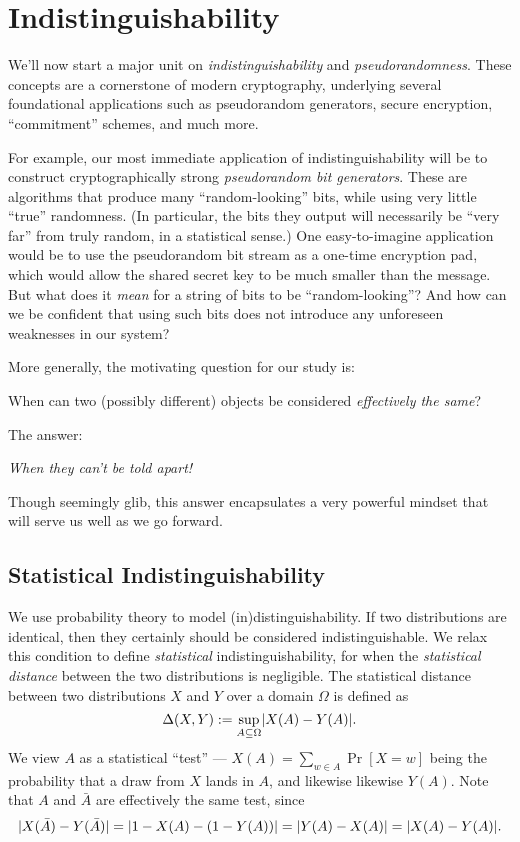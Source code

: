\documentclass[11pt]{article}
\begin{document}
\thispagestyle{fancy}           %


\section{Indistinguishability}
\label{sec:indistinguishability}

We'll now start a major unit on \emph{indistinguishability} and
\emph{pseudorandomness}.  These concepts are a cornerstone of modern
cryptography, underlying several foundational applications such as
pseudorandom generators, secure encryption, ``commitment'' schemes,
and much more.

For example, our most immediate application of indistinguishability
will be to construct cryptographically strong \emph{pseudorandom bit
  generators}.  These are algorithms that produce many
``random-looking'' bits, while using very little ``true'' randomness.
(In particular, the bits they output will necessarily be ``very far''
from truly random, in a statistical sense.)  One easy-to-imagine
application would be to use the pseudorandom bit stream as a one-time
encryption pad, which would allow the shared secret key to be much
smaller than the message.  But what does it \emph{mean} for a string
of bits to be ``random-looking''?  And how can we be confident that
using such bits does not introduce any unforeseen weaknesses in our
system?

More generally, the motivating question for our study is:
\begin{center}
  When can two (possibly different) objects be considered
  \emph{effectively the same}?
\end{center}
The answer:
\begin{center}
  \emph{When they can't be told apart!}
\end{center}
Though seemingly glib, this answer encapsulates a very powerful
mindset that will serve us well as we go forward.

\subsection{Statistical Indistinguishability}
\label{sec:stat-indist}

We use probability theory to model (in)distinguishability.  If two
distributions are identical, then they certainly should be considered
indistinguishable.  We relax this condition to define
\emph{statistical} indistinguishability, for when the
\emph{statistical distance} between the two distributions is
negligible.  The statistical distance between two distributions $X$
and $Y$ over a domain $\Omega$ is defined as
\[ \Delta(X,Y) := \sup_{A \subseteq \Omega} \lvert X(A) - Y(A)\rvert. \] We
view $A$ as a statistical ``test'' --- $X(A) = \sum_{w \in A}
\Pr[X=w]$ being the probability that a draw from $X$ lands in $A$, and
likewise likewise $Y(A)$.  Note that $A$ and $\bar{A}$ are effectively
the same test, since \[ \lvert X(\bar{A})-Y(\bar{A})\rvert =
\lvert1-X(A)-(1-Y(A))\rvert = \lvert Y(A)-X(A)\rvert = \lvert X(A)-Y(A)\rvert. \]
\end{document}
